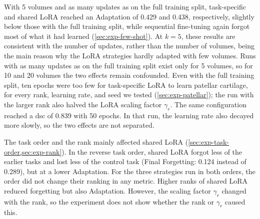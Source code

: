 With 5 volumes and as many updates as on the full training split, task-specific and shared LoRA reached an Adaptation of 0.429 and 0.438, respectively, slightly below those with the full training split, while sequential fine-tuning again forgot most of what it had learned (\cref{sec:exp-few-shot}).
At $k = 5$, these results are consistent with the number of updates, rather than the number of volumes, being the main reason why the LoRA strategies hardly adapted with few volumes.
Runs with as many updates as on the full training split exist only for 5 volumes, so for 10 and 20 volumes the two effects remain confounded.
Even with the full training split, ten epochs were too few for task-specific LoRA to learn patellar cartilage, for every rank, learning rate, and seed we tested (\cref{sec:exp-patellar}); the run with the larger rank also halved the LoRA scaling factor $\gamma_r$.
The same configuration reached a \gls{dsc} of 0.839 with 50 epochs.
In that run, the learning rate also decayed more slowly, so the two effects are not separated.

The task order and the rank mainly affected shared LoRA (\cref{sec:exp-task-order,sec:exp-rank}).
In the reverse task order, shared LoRA forgot less of the earlier tasks and lost less of the control task (Final Forgetting: 0.124 instead of 0.289), but at a lower Adaptation.
For the three strategies run in both orders, the order did not change their ranking in any metric.
Higher ranks of shared LoRA reduced forgetting but also Adaptation.
However, the scaling factor $\gamma_r$ changed with the rank, so the experiment does not show whether the rank or $\gamma_r$ caused this.


